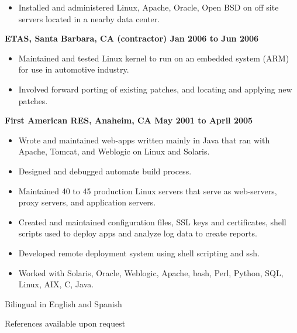 \documentclass{res}
\begin{document}
\begin{resume}
\begin{itemize}
\item
	Installed and administered Linux, Apache, Oracle, Open BSD on
	off site servers located in a nearby data center.
\end{itemize}

{\large \bf ETAS, Santa Barbara, CA (contractor) \hfill Jan 2006 to
Jun 2006}

\begin{itemize}

\item
	Maintained and tested Linux kernel to run on an embedded system
	(ARM) for use in automotive industry.

\item
	Involved forward porting of existing patches, and locating and
	applying new patches.

\end{itemize}


{\large \bf First American RES, Anaheim, CA \hfill May 2001 to April 2005}

\begin{itemize}

\item
	Wrote and maintained web-apps written mainly in Java that ran
	with Apache, Tomcat, and Weblogic on Linux and Solaris.
\item
	Designed and debugged automate build process.
\item
	Maintained 40 to 45 production Linux servers that serve as
	web-servers, proxy servers, and application servers.
\item
	Created and maintained configuration files, SSL keys and
	certificates, shell scripts used to deploy apps and analyze log
	data to create reports.

\item
	Developed remote deployment system using shell scripting and ssh.

\item
	Worked with Solaris, Oracle, Weblogic, Apache, bash, Perl,
	Python, SQL, Linux, AIX, C, Java.

\end{itemize}

Bilingual in English and Spanish

References available upon request

\end{resume}
\end{document}

